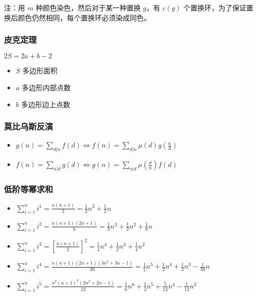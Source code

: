 \documentclass[]{article}
\providecommand{\tightlist}{%
  \setlength{\itemsep}{0pt}\setlength{\parskip}{0pt}}
\begin{document}
注：用 \(m\) 种颜色染色，然后对于某一种置换 \(g\)，有 \(c(g)\)
个置换环，为了保证置换后颜色仍然相同，每个置换环必须染成同色。

\hypertarget{ux76aeux514bux5b9aux7406}{%
\subsubsection{皮克定理}\label{ux76aeux514bux5b9aux7406}}

\(2S = 2a+b-2\)

\begin{itemize}
\tightlist
\item
  \(S\) 多边形面积
\item
  \(a\) 多边形内部点数
\item
  \(b\) 多边形边上点数
\end{itemize}

\hypertarget{ux83abux6bd4ux4e4cux65afux53cdux6f14}{%
\subsubsection{莫比乌斯反演}\label{ux83abux6bd4ux4e4cux65afux53cdux6f14}}

\begin{itemize}
\tightlist
\item
  \(g(n) = \sum_{d|n} f(d) \Leftrightarrow f(n) = \sum_{d|n} \mu (d) g( \frac{n}{d})\)
\item
  \(f(n)=\sum_{n|d}g(d) \Leftrightarrow g(n)=\sum_{n|d} \mu(\frac{d}{n}) f(d)\)
\end{itemize}

\hypertarget{ux4f4eux9636ux7b49ux5e42ux6c42ux548c}{%
\subsubsection{低阶等幂求和}\label{ux4f4eux9636ux7b49ux5e42ux6c42ux548c}}

\begin{itemize}
\tightlist
\item
  \(\sum_{i=1}^{n} i^{1} = \frac{n(n+1)}{2} = \frac{1}{2}n^2 +\frac{1}{2} n\)
\item
  \(\sum_{i=1}^{n} i^{2} = \frac{n(n+1)(2n+1)}{6} = \frac{1}{3}n^3 + \frac{1}{2}n^2 + \frac{1}{6}n\)
\item
  \(\sum_{i=1}^{n} i^{3} = \left[\frac{n(n+1)}{2}\right]^{2} = \frac{1}{4}n^4 + \frac{1}{2}n^3 + \frac{1}{4}n^2\)
\item
  \(\sum_{i=1}^{n} i^{4} = \frac{n(n+1)(2n+1)(3n^2+3n-1)}{30} = \frac{1}{5}n^5 + \frac{1}{2}n^4 + \frac{1}{3}n^3 - \frac{1}{30}n\)
\item
  \(\sum_{i=1}^{n} i^{5} = \frac{n^{2}(n+1)^{2}(2n^2+2n-1)}{12} = \frac{1}{6}n^6 + \frac{1}{2}n^5 + \frac{5}{12}n^4 - \frac{1}{12}n^2\)
\end{itemize}
\end{document}
